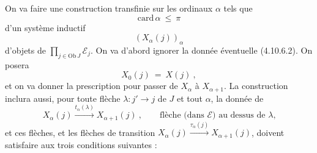 \documentclass[11pt]{article}
\newcommand{\printedpage}[1]{\marginpar{\footnotesize p.~#1}}
\newcommand{\msp}[1]{\marginpar{\footnotesize [#1]}}
\newcommand{\Ob}{\mathrm{Ob}\,}
\newcommand{\card}{\mathrm{card}\,}
\begin{document}
On va faire une construction transfinie sur les ordinaux $\alpha$ tels que
\[
\card\alpha\ \leqslant\ \pi
\]
d'un système inductif
\[
(X_\alpha(j))_\alpha
\]
d'objets de $\prod_{j\in\Ob J}\mathcal{E}_j$. On va d'abord ignorer la donnée éventuelle (4.10.6.2). On posera
\[
X_0(j)\ =\ X(j)\ , \tag*{(4.10.6.4)}
\]
et on va donner la prescription pour passer de $X_\alpha$ à $X_{\alpha+1}$. La construction inclura aussi, pour toute flèche $\lambda : j'\longrightarrow j$ de $J$ et tout $\alpha$, la donnée de
\[
X_\alpha(j) \xrightarrow{t_\alpha(\lambda)} X_{\alpha+1}(j)\ , \qquad \text{flèche (dans $\mathcal{E}$) au dessus de $\lambda$,} \tag*{(4.10.6.5)} %
\]
et ces flèches, et les flèches de transition $X_\alpha(j)\xrightarrow{\tau_\alpha(j)}X_{\alpha+1}(j)$, doivent
\printedpage{97}
\msp{256}
satisfaire aux trois conditions suivantes :
\end{document}
